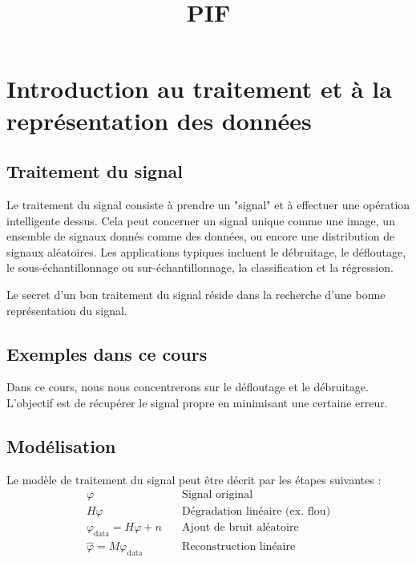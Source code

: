 \documentclass[12pt]{article}
\title{PIF}
\author{}
\date{}
\begin{document}
\maketitle
\tableofcontents
\newpage

\section{Introduction au traitement et à la représentation des données}

\subsection{Traitement du signal}

Le traitement du signal consiste à prendre un "signal" et à effectuer une opération intelligente dessus. Cela peut concerner un signal unique comme une image, un ensemble de signaux donnés comme des données, ou encore une distribution de signaux aléatoires. Les applications typiques incluent le débruitage, le défloutage, le sous-échantillonnage ou sur-échantillonnage, la classification et la régression.

\begin{tcolorbox}[title={Intuition}]
Le secret d'un bon traitement du signal réside dans la recherche d'une bonne représentation du signal.
\end{tcolorbox}

\subsection{Exemples dans ce cours}

Dans ce cours, nous nous concentrerons sur le défloutage et le débruitage. L'objectif est de récupérer le signal propre en minimisant une certaine erreur.


\subsection{Modélisation}

Le modèle de traitement du signal peut être décrit par les étapes suivantes :
\begin{align*}
\varphi & \quad \text{Signal original} \\
H\varphi & \quad \text{Dégradation linéaire (ex. flou)} \\
\varphi_{\text{data}} = H\varphi + n & \quad \text{Ajout de bruit aléatoire} \\
\hat{\varphi} = M\varphi_{\text{data}} & \quad \text{Reconstruction linéaire}
\end{align*}
\end{document}
